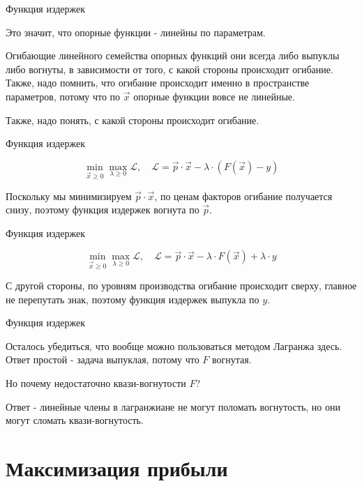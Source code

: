 \documentclass{beamer}
\begin{document}
\begin{frame}{Функция издержек}

Это значит, что опорные функции - линейны по параметрам.

Огибающие линейного семейства опорных функций они всегда либо выпуклы либо вогнуты, в зависимости от того, с какой стороны происходит огибание. Также, надо помнить, что огибание происходит именно в пространстве параметров, потому что по $\vec x$ опорные функции вовсе не линейные. 

Также, надо понять, с какой стороны происходит огибание.

\end{frame}

\begin{frame}{Функция издержек}

$$ \min_{\vec x \geqslant 0} \max_{\lambda \geqslant 0} \mathcal{L}, \quad \mathcal{L} = \vec p \cdot \vec x - \lambda \cdot (F(\vec x) - y)$$

Поскольку мы минимизируем $\vec p \cdot \vec x$, по ценам факторов огибание получается снизу, поэтому функция издержек вогнута по $\vec p$.

\end{frame}

\begin{frame}{Функция издержек}

$$ \min_{\vec x \geqslant 0} \max_{\lambda \geqslant 0} \mathcal{L}, \quad \mathcal{L} = \vec p \cdot \vec x - \lambda \cdot F(\vec x) + \lambda \cdot y$$

С другой стороны, по уровням производства огибание происходит сверху, главное не перепутать знак, поэтому функция издержек выпукла по $y$.

\end{frame}

\begin{frame}{Функция издержек}

Осталось убедиться, что вообще можно пользоваться методом Лагранжа здесь. Ответ простой - задача выпуклая, потому что $F$ вогнутая. 

Но почему недостаточно квази-вогнутости $F$? 

Ответ - линейные члены в лагранжиане не могут поломать вогнутость, но они могут сломать квази-вогнутость.

\end{frame}

\section{Максимизация прибыли}
\end{document}
